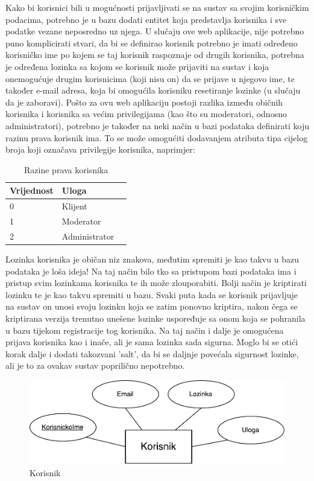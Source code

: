 \documentclass[times, utf8, zavrsni]{fer}
\begin{document}
Kako bi korisnici bili u mogućnosti prijavljivati se na sustav sa svojim korisničkim podacima, potrebno je u bazu dodati entitet koja predstavlja korisnika i sve podatke vezane neposredno uz njega. U slučaju ove web aplikacije, nije potrebno puno komplicirati stvari, da bi se definirao korisnik potrebno je imati određeno korisničko ime po kojem se taj korisnik raspoznaje od drugih korisnika, potrebna je određena lozinka sa kojom se korisnik može prijaviti na sustav i koja onemogućuje drugim korisnicima (koji nisu on) da se prijave u njegovo ime, te također e-mail adresa, koja bi omogućila korisniku resetiranje lozinke (u slučaju da je zaboravi). Pošto za ovu web aplikaciju postoji razlika između običnih korisnika i korisnika sa većim privilegijama (kao što su moderatori, odnosno administratori), potrebno je također na neki način u bazi podataka definirati koju razinu prava korisnik ima. To se može omogućiti dodavanjem atributa tipa cijelog broja koji označava privilegije korisnika, naprimjer:

\begin{table}[H]
\caption{Razine prava korisnika}
\label{tbl:razine_prava}
\centering
\begin{tabular}{llr}
\hline
Vrijednost & Uloga\\
\hline
0 & Klijent \\
1 & Moderator \\
2 & Administrator \\ 
\hline
\end{tabular}
\end{table}

Lozinka korisnika je običan niz znakova, međutim spremiti je kao takvu u bazu podataka je loša ideja! Na taj način bilo tko sa pristupom bazi podataka ima i pristup svim lozinkama korisnika te ih može zlouporabiti. Bolji način je kriptirati lozinku te je kao takvu spremiti u bazu. Svaki puta kada se korisnik prijavljuje na sustav on unosi svoju lozinku koja se zatim ponovno kriptira, nakon čega se kriptirana verzija trenutno unešene lozinke uspoređuje sa onom koja se pohranila u bazu tijekom registracije tog korisnika. Na taj način i dalje je omogućena prijava korisnika kao i inače, ali je sama lozinka sada sigurna. Moglo bi se otići korak dalje i dodati takozvani 'salt', da bi se daljnje povećala sigurnost lozinke, ali je to za ovakav sustav poprilično nepotrebno.\\

\begin{figure}[H]
\centering
\includegraphics[width=\textwidth,height=\textheight,keepaspectratio]{img/korisnik.pdf}
\caption{Korisnik}
\label{fig:korisnik}
\end{figure}
\end{document}
